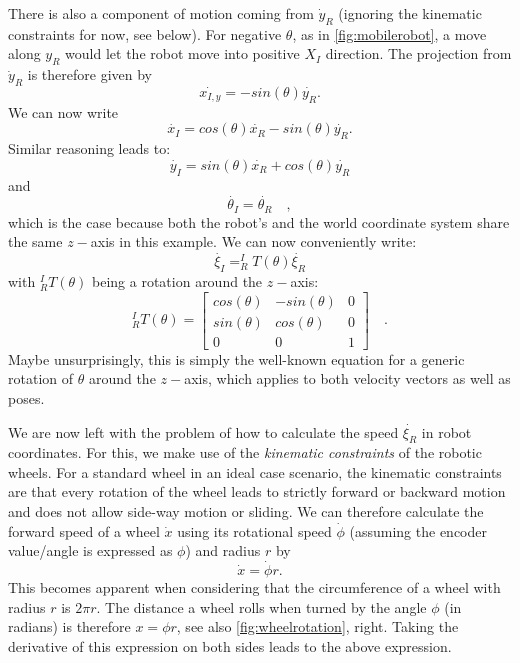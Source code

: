 There is also a component of motion coming from $ \dot{y}_R$ (ignoring the kinematic constraints for now, see below).  For negative $ \theta$, as in \cref{fig:mobilerobot}, a move along $y_R$ would let the robot move into positive $ X_I$ direction. The projection from $ \dot{y}_R$ is therefore given by
\begin{equation}
\dot{x_{I,y}}=-sin(\theta)\dot{y_R}.
\end{equation}
We can now write
\begin{equation}
\dot{x_I}=cos(\theta) \dot{x_R} - sin(\theta) \dot{y_R}.
\end{equation}
Similar reasoning leads to:
\begin{equation}
\dot{y_I}=sin(\theta) \dot{x_R} + cos(\theta) \dot{y_R}
\end{equation}
and
\begin{equation}
\dot{\theta_I}=\dot{\theta_R}\quad,
\end{equation}
which is the case because both the robot's and the world coordinate system share the same $z-$axis in this example.
We can now conveniently write:
\begin{equation}
\dot{\xi_I}=^I_RT(\theta)\dot{\xi_R}
\end{equation}
with $^I_RT(\theta)$ being a rotation around the $z-$axis:
\begin{equation}
^I_RT(\theta)=\left[\begin{array}{ccc}
cos(\theta) & -sin(\theta) & 0 \\
sin(\theta) & cos(\theta) & 0 \\
0 & 0 & 1\end{array}\right]\quad .
\end{equation}
Maybe unsurprisingly, this is simply the well-known equation for a generic rotation of $\theta$ around the $z-$axis, which applies to both velocity vectors as well as poses.

We are now left with the problem of how to calculate the speed $ \dot{\xi_R}$ in robot coordinates. For this, we make use of the \textsl{kinematic constraints} of the robotic wheels.
For a standard wheel in an ideal case scenario, the kinematic constraints are that every rotation of the wheel leads to strictly forward or backward motion and does not allow side-way motion or sliding. We can therefore calculate the forward speed of a wheel $ \dot{x}$ using its rotational speed $ \dot{\phi}$ (assuming the encoder value/angle is expressed as $ \phi$) and radius $ r$ by
\begin{equation}
\dot{x}=\dot{\phi}r.
\end{equation}
This becomes apparent when considering that the circumference of a wheel with radius $r$ is $2\pi r$. The distance a wheel rolls when turned by the angle $ \phi$ (in radians) is therefore $ x=\phi r$, see also \cref{fig:wheelrotation}, right. Taking the derivative of this expression on both sides leads to the above expression.

